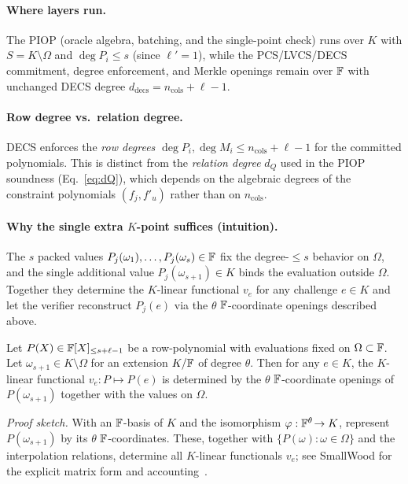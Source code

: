 \paragraph{Where layers run.}
The PIOP (oracle algebra, batching, and the single-point check) runs over \(K\) with \(S=K\setminus\Omega\) and \(\deg P_i \le s\) (since \(\ell'=1\)),
while the PCS/LVCS/DECS commitment, degree enforcement, and Merkle openings remain over \(\mathbb{F}\) with unchanged DECS degree
\(
d_{\mathrm{decs}} = n_{\mathrm{cols}}+\ell-1.
\)

\paragraph{Row degree vs.\ relation degree.}
DECS enforces the \emph{row degrees} $\deg P_i,\deg M_i\le n_{\mathrm{cols}}+\ell-1$ for the committed polynomials.
This is distinct from the \emph{relation degree} $d_Q$ used in the PIOP soundness (Eq.~\eqref{eq:dQ}), which depends on the algebraic degrees of the constraint polynomials $(f_j,f'_u)$ rather than on $n_{\mathrm{cols}}$.

\paragraph{Why the single extra \(K\)-point suffices (intuition).}
The \(s\) packed values \(P_j(\omega_1),\dots,P_j(\omega_s)\in \mathbb{F}\) fix the degree-\(\le s\) behavior on \(\Omega\), and the single additional value \(P_j(\omega_{s+1})\in K\) binds the evaluation outside \(\Omega\).
Together they determine the \(K\)-linear functional \(v_e\) for any challenge \(e\in K\) and let the verifier reconstruct \(P_j(e)\) via the \(\theta\) \(\mathbb{F}\)-coordinate openings described above.

\begin{lemma}\label{lem:singleK}
Let $P(X)\in \mathbb{F}[X]_{\le s+\ell-1}$ be a row-polynomial with evaluations fixed on $\Omega\subset \mathbb{F}$.
Let $\omega_{s+1}\in K\setminus \Omega$ for an extension $K/\mathbb{F}$ of degree $\theta$.
Then for any $e\in K$, the $K$-linear functional $v_e:P\mapsto P(e)$ is determined by the $\theta$ $\mathbb{F}$-coordinate openings of $P(\omega_{s+1})$ together with the values on $\Omega$.
\end{lemma}
\noindent\emph{Proof sketch.} With an $\mathbb{F}$-basis of $K$ and the isomorphism $\varphi: \mathbb{F}^{\theta}\!\to K$, represent $P(\omega_{s+1})$ by its $\theta$ $\mathbb{F}$-coordinates. These, together with $\{P(\omega):\omega\in\Omega\}$ and the interpolation relations, determine all $K$-linear functionals $v_e$; see SmallWood for the explicit matrix form and accounting~\cite[§5.4, Tab.~2]{cryptoeprint:2025/1085}.

